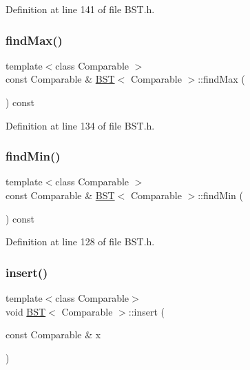 Definition at line 141 of file B\+S\+T.\+h.

\hypertarget{class_b_s_t_a03485f3b0b150f1e69a12c28d26d8092}{}\label{class_b_s_t_a03485f3b0b150f1e69a12c28d26d8092} 
\subsubsection{\texorpdfstring{find\+Max()}{findMax()}}
{\footnotesize\ttfamily template$<$class Comparable $>$ \\
const Comparable \& \hyperlink{class_b_s_t}{B\+ST}$<$ Comparable $>$\+::find\+Max (\begin{DoxyParamCaption}{ }\end{DoxyParamCaption}) const}



Definition at line 134 of file B\+S\+T.\+h.

\hypertarget{class_b_s_t_aa52491ff35aec517961937a17a9fa493}{}\label{class_b_s_t_aa52491ff35aec517961937a17a9fa493} 
\subsubsection{\texorpdfstring{find\+Min()}{findMin()}}
{\footnotesize\ttfamily template$<$class Comparable $>$ \\
const Comparable \& \hyperlink{class_b_s_t}{B\+ST}$<$ Comparable $>$\+::find\+Min (\begin{DoxyParamCaption}{ }\end{DoxyParamCaption}) const}



Definition at line 128 of file B\+S\+T.\+h.

\hypertarget{class_b_s_t_a2b117df6521c7d61dac75ff2c938bae7}{}\label{class_b_s_t_a2b117df6521c7d61dac75ff2c938bae7} 
\subsubsection{\texorpdfstring{insert()}{insert()}}
{\footnotesize\ttfamily template$<$class Comparable$>$ \\
void \hyperlink{class_b_s_t}{B\+ST}$<$ Comparable $>$\+::insert (\begin{DoxyParamCaption}\item[{const Comparable \&}]{x }\end{DoxyParamCaption})}



